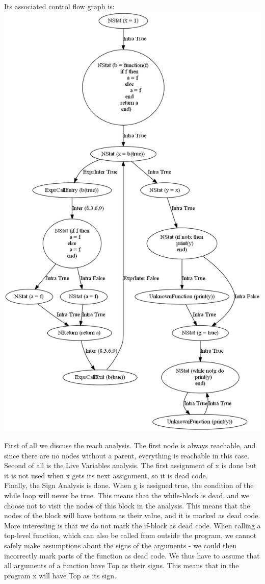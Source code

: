 \documentclass[10pt]{article}
\begin{document}
Its associated control flow graph is: \\
\includegraphics[scale=0.45]{utTesta.png}

First of all we discuss the reach analysis. The first node is always reachable, and since there are no nodes without a parent, everything is reachable in this case.\\
Second of all is the Live Variables analysis. The first assignment of x is done but it is not used when x gets its next assignment, so it is dead code.\\
Finally, the Sign Analysis is done. When g is assigned true, the condition of the while loop will never be true. This means that the while-block is dead, and we choose not to visit the nodes of this block in the analysis. This means that the nodes of the block will have bottom as their value, and it is marked as dead code.\\
More interesting is that we do not mark the if-block as dead code. When calling a top-level function, which can also be called from outside the program, we cannot safely make assumptions about the signs of the arguments - we could then incorrectly mark parts of the function as dead code. We thus have to assume that all arguments of a function have Top as their signs. This means that in the program x will have Top as its sign.
\end{document}
